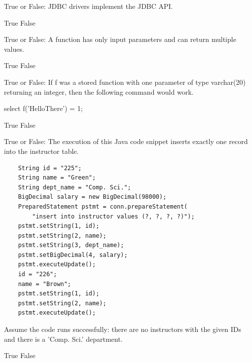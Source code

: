 \documentclass[12pt]{exam}
\begin{document}
\begin{questions}
\begin{minipage}{\linewidth}
\question[2]
True or False: JDBC drivers implement the JDBC API.\par\vspace{0.5em}
\begin{checkboxes}
    \CorrectChoice True
    \choice False
\end{checkboxes}
\end{minipage}\vspace{1em}

\begin{minipage}{\linewidth}
\question[2]
True or False: A function has only input parameters and can return multiple values.\par\vspace{0.5em}
\begin{checkboxes}
    \choice True
    \CorrectChoice False
\end{checkboxes}
\end{minipage}\vspace{1em}

\begin{minipage}{\linewidth}
\question[2]
True or False: If f was a stored function with one parameter of type varchar(20) returning an integer, then the following command would work.\par\vspace{0.5em}
select f('HelloThere') = 1;\par\vspace{0.5em}
\begin{checkboxes}
    \CorrectChoice True
    \choice False
\end{checkboxes}
\end{minipage}\vspace{1em}

\begin{minipage}{\linewidth}
\question[4]
True or False: The execution of this Java code snippet inserts exactly one record into the instructor table.\par\vspace{0.5em}
\begin{verbatim}
	String id = "225";
	String name = "Green";
	String dept_name = "Comp. Sci.";
	BigDecimal salary = new BigDecimal(98000);
	PreparedStatement pstmt = conn.prepareStatement(
        "insert into instructor values (?, ?, ?, ?)");
	pstmt.setString(1, id);
	pstmt.setString(2, name);
	pstmt.setString(3, dept_name);
	pstmt.setBigDecimal(4, salary);
	pstmt.executeUpdate();
	id = "226";
	name = "Brown";
	pstmt.setString(1, id);
	pstmt.setString(2, name);
	pstmt.executeUpdate();
\end{verbatim}
Assume the code runs successfully: there are no instructors with the given IDs and there is a 'Comp. Sci.' department.\par\vspace{0.5em}
\begin{checkboxes}
    \choice True
    \CorrectChoice False
\end{checkboxes}
\end{minipage}\vspace{1em}


\end{questions}
\end{document}
